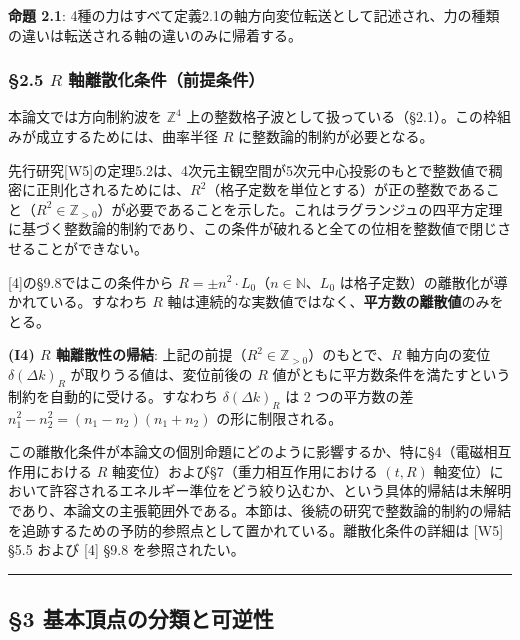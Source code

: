 \documentclass[
  a4paper,11pt]{ltjsarticle}
\theoremstyle{definition}
\theoremstyle{remark}
\begin{document}
\textbf{命題 2.1}:
4種の力はすべて定義2.1の軸方向変位転送として記述され、力の種類の違いは転送される軸の違いのみに帰着する。

\subsubsection{\texorpdfstring{§2.5 \(R\)
軸離散化条件（前提条件）}{§2.5 R 軸離散化条件（前提条件）}}\label{r-ux8ef8ux96e2ux6563ux5316ux6761ux4ef6ux524dux63d0ux6761ux4ef6}

本論文では方向制約波を \(\mathbb{Z}^4\)
上の整数格子波として扱っている（§2.1）。この枠組みが成立するためには、曲率半径
\(R\) に整数論的制約が必要となる。

先行研究{[}W5{]}の定理5.2は、4次元主観空間が5次元中心投影のもとで整数値で稠密に正則化されるためには、\(R^2\)（格子定数を単位とする）が正の整数であること（\(R^2 \in \mathbb{Z}_{>0}\)）が必要であることを示した。これはラグランジュの四平方定理に基づく整数論的制約であり、この条件が破れると全ての位相を整数値で閉じさせることができない。

{[}4{]}の§9.8ではこの条件から
\(R = \pm n^2 \cdot L_0\)（\(n \in \mathbb{N}\)、\(L_0\)
は格子定数）の離散化が導かれている。すなわち \(R\)
軸は連続的な実数値ではなく、\textbf{平方数の離散値}のみをとる。

\textbf{(I4) \(R\) 軸離散性の帰結}:
上記の前提（\(R^2 \in \mathbb{Z}_{>0}\)）のもとで、\(R\) 軸方向の変位
\(\delta(\Delta k)_R\) が取りうる値は、変位前後の \(R\)
値がともに平方数条件を満たすという制約を自動的に受ける。すなわち
\(\delta(\Delta k)_R\) は 2 つの平方数の差
\(n_1^2 - n_2^2 = (n_1 - n_2)(n_1 + n_2)\) の形に制限される。

この離散化条件が本論文の個別命題にどのように影響するか、特に§4（電磁相互作用における
\(R\) 軸変位）および§7（重力相互作用における \((t, R)\)
軸変位）において許容されるエネルギー準位をどう絞り込むか、という具体的帰結は未解明であり、本論文の主張範囲外である。本節は、後続の研究で整数論的制約の帰結を追跡するための予防的参照点として置かれている。離散化条件の詳細は
{[}W5{]} §5.5 および {[}4{]} §9.8 を参照されたい。

\begin{center}\rule{0.5\linewidth}{0.5pt}\end{center}

\subsection{§3
基本頂点の分類と可逆性}\label{ux57faux672cux9802ux70b9ux306eux5206ux985eux3068ux53efux9006ux6027}
\end{document}
